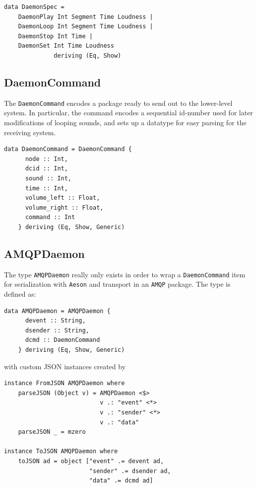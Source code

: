 \begin{verbatim}
data DaemonSpec = 
    DaemonPlay Int Segment Time Loudness |
    DaemonLoop Int Segment Time Loudness |
    DaemonStop Int Time |
    DaemonSet Int Time Loudness 
              deriving (Eq, Show)
\end{verbatim}

\subsection{DaemonCommand}
\label{sec:daemoncommand}

The \texttt{DaemonCommand} encodes a package ready to send out to the
lower-level system. In particular, the command encodes a sequential
id-number used for later modifications of looping sounds, and sets up
a datatype for easy parsing for the receiving system.

\begin{verbatim}
data DaemonCommand = DaemonCommand {
      node :: Int,
      dcid :: Int,
      sound :: Int,
      time :: Int,
      volume_left :: Float,
      volume_right :: Float,
      command :: Int
    } deriving (Eq, Show, Generic)
\end{verbatim}

\subsection{AMQPDaemon}
\label{sec:amqpdaemon}

The type \texttt{AMQPDaemon} really only exists in order to wrap a
\texttt{DaemonCommand} item for serialization with \texttt{Aeson} and
transport in an \texttt{AMQP} package. The type is defined as:
\begin{verbatim}
data AMQPDaemon = AMQPDaemon {
      devent :: String,
      dsender :: String,
      dcmd :: DaemonCommand
    } deriving (Eq, Show, Generic)
\end{verbatim}
with custom JSON instances created by
\begin{verbatim}
instance FromJSON AMQPDaemon where
    parseJSON (Object v) = AMQPDaemon <$> 
                           v .: "event" <*>
                           v .: "sender" <*>
                           v .: "data"
    parseJSON _ = mzero

instance ToJSON AMQPDaemon where
    toJSON ad = object ["event" .= devent ad, 
                        "sender" .= dsender ad,
                        "data" .= dcmd ad]
\end{verbatim}


